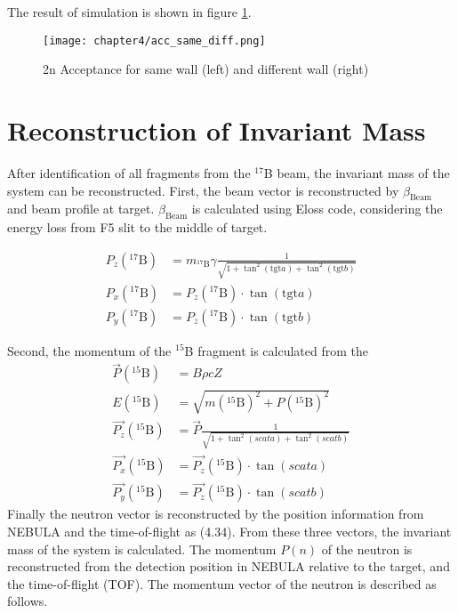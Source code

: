 The result of simulation is shown in figure \ref{fig:acc_same_diff}.
\begin{figure}
    \centering
    \texttt{[image: chapter4/acc\_same\_diff.png]}
    \caption[$2n$ Acceptance for $E_{rel}$ and $\theta_{scat}$]{2n Acceptance for same wall (left) and different wall (right)}
    \label{fig:acc_same_diff}
\end{figure}


\section{Reconstruction of Invariant Mass}

After identification of all fragments from the ${}^{17}$B beam, the invariant mass of the system can be reconstructed. First, the beam vector is reconstructed by $\beta_{\text{Beam}}$ and beam profile at target. $\beta_{\text{Beam}}$ is calculated using Eloss code, considering the energy loss from F5 slit to the middle of target.

\begin{align}
    P_z ({}^{17}\text{B}) &=  m_{{}^{17}\text{B}} \gamma \frac{1}{\sqrt{1+ \tan^2(\text{tgt}a)+ \tan^2(\text{tgt}b)}}\\
    P_x ({}^{17}\text{B}) &=  P_z ({}^{17}\text{B}) \cdot \tan(\text{tgt}a)\\ 
    P_y ({}^{17}\text{B}) &=  P_z ({}^{17}\text{B}) \cdot \tan(\text{tgt}b)
\end{align}

Second, the momentum of the ${}^{15}$B fragment is calculated from the 
\begin{align}
    \vec{P} ({}^{15}\text{B}) &= B\rho c Z \\
    E ({}^{15}\text{B}) &= \sqrt{m({}^{15}\text{B})^{2} + P({}^{15}\text{B})^{2}}\\
    \vec{P_z} ({}^{15}\text{B}) &= \vec{P} \frac{1}{\sqrt{1 + \tan^2(scata)+ \tan^2(scatb)}}\\
    \vec{P_x} ({}^{15}\text{B}) &= \vec{P_z} ({}^{15}\text{B}) \cdot \tan(scata)\\
    \vec{P_y} ({}^{15}\text{B}) &= \vec{P_z} ({}^{15}\text{B}) \cdot \tan(scatb)
\end{align}
Finally the neutron vector is reconstructed by the position information from NEBULA and the time-of-flight as (4.34). From these three vectors, the invariant mass of the system is calculated.
The momentum $P(n)$ of the neutron is reconstructed from the detection position in NEBULA relative to the target, and the time-of-flight (TOF). The momentum vector of the neutron is described as follows.

